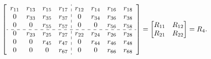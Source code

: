 \documentclass[12pt]{article}
\numberwithin{equation}{section}
\begin{document}
\begin{align*}
&\begin{bmatrix}
\begin{array}{cccc:cccc}
 r_{11} & r_{13} & r_{15} & r_{17} & r_{12} & r_{14} & r_{16} & r_{18}\\
 0      & r_{33} & r_{35} & r_{37} & 0      & r_{34} & r_{36} & r_{38}\\
 0      & 0      & r_{55} & r_{57} & 0      & 0      & r_{56} & r_{58}\\
 \cdashline{1-8}
 0      & r_{23} & r_{25} & r_{27} & r_{22} & r_{24} & r_{26} & r_{28}\\
 0      & 0      & r_{45} & r_{47} & 0      & r_{44} & r_{46} & r_{48}\\
 0      & 0      & 0      & r_{67} & 0      & 0      & r_{66} & r_{68}\\
\end{array}
\end{bmatrix} 
=\begin{bmatrix}
    R_{11} & R_{12}\\R_{21} & R_{22}
\end{bmatrix} = R_4.
\end{align*}
\end{document}
